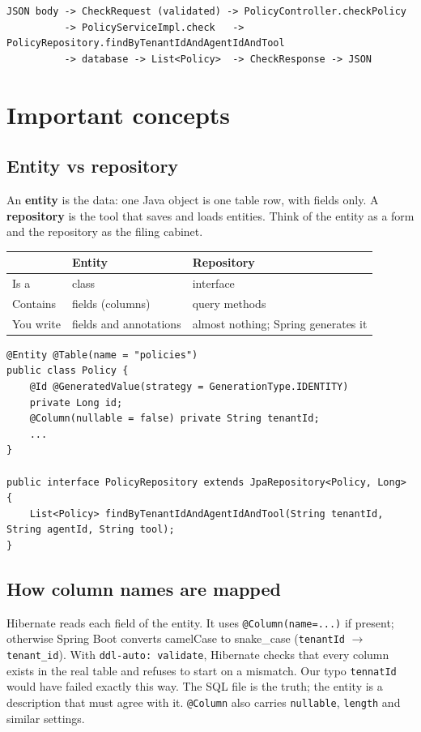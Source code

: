 \documentclass[11pt,a4paper]{article}
\newcommand{\code}[1]{\texttt{\small #1}}
\begin{document}
\begin{lstlisting}[style=java,caption={Request flow for POST /policies/check}]
JSON body -> CheckRequest (validated) -> PolicyController.checkPolicy
          -> PolicyServiceImpl.check   -> PolicyRepository.findByTenantIdAndAgentIdAndTool
          -> database -> List<Policy>  -> CheckResponse -> JSON
\end{lstlisting}

\section{Important concepts}

\subsection{Entity vs repository}
An \textbf{entity} is the data: one Java object is one table row, with fields only.
A \textbf{repository} is the tool that saves and loads entities. Think of the entity as a
form and the repository as the filing cabinet.

\begin{tabular}{@{}p{2.4cm}p{6.2cm}p{6.4cm}@{}}
\toprule
 & \textbf{Entity} & \textbf{Repository} \\
\midrule
Is a & class & interface \\
Contains & fields (columns) & query methods \\
You write & fields and annotations & almost nothing; Spring generates it \\
\bottomrule
\end{tabular}

\begin{lstlisting}[style=java]
@Entity @Table(name = "policies")
public class Policy {
    @Id @GeneratedValue(strategy = GenerationType.IDENTITY)
    private Long id;
    @Column(nullable = false) private String tenantId;
    ...
}

public interface PolicyRepository extends JpaRepository<Policy, Long> {
    List<Policy> findByTenantIdAndAgentIdAndTool(String tenantId, String agentId, String tool);
}
\end{lstlisting}

\subsection{How column names are mapped}
Hibernate reads each field of the entity. It uses \code{@Column(name=...)} if present;
otherwise Spring Boot converts camelCase to snake\_case (\code{tenantId} $\rightarrow$
\code{tenant\_id}). With \code{ddl-auto: validate}, Hibernate checks that every column
exists in the real table and refuses to start on a mismatch. Our typo \code{tennatId}
would have failed exactly this way. The SQL file is the truth; the entity is a
description that must agree with it. \code{@Column} also carries \code{nullable}, \code{length} and similar settings.
\end{document}
